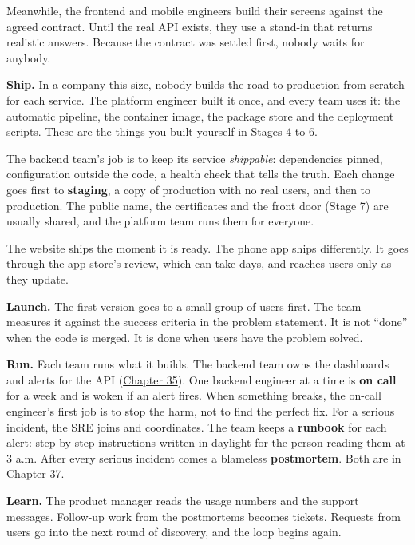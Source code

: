 Meanwhile, the frontend and mobile engineers build their screens against the agreed contract. Until the real API exists, they use a stand-in that returns realistic answers. Because the contract was settled first, nobody waits for anybody.

\textbf{Ship.} In a company this size, nobody builds the road to production from scratch for each service. The platform engineer built it once, and every team uses it: the automatic pipeline, the container image, the package store and the deployment scripts. These are the things you built yourself in Stages 4 to 6.

The backend team's job is to keep its service \emph{shippable}: dependencies pinned, configuration outside the code, a health check that tells the truth. Each change goes first to \textbf{staging}, a copy of production with no real users, and then to production. The public name, the certificates and the front door (Stage 7) are usually shared, and the platform team runs them for everyone.

The website ships the moment it is ready. The phone app ships differently. It goes through the app store's review, which can take days, and reaches users only as they update.

\textbf{Launch.} The first version goes to a small group of users first. The team measures it against the success criteria in the problem statement. It is not ``done'' when the code is merged. It is done when users have the problem solved.

\textbf{Run.} Each team runs what it builds. The backend team owns the dashboards and alerts for the API (\hyperref[ch:35-observability]{Chapter 35}). One backend engineer at a time is \textbf{on call} for a week and is woken if an alert fires. When something breaks, the on-call engineer's first job is to stop the harm, not to find the perfect fix. For a serious incident, the SRE joins and coordinates. The team keeps a \textbf{runbook} for each alert: step-by-step instructions written in daylight for the person reading them at 3 a.m. After every serious incident comes a blameless \textbf{postmortem}. Both are in \hyperref[ch:37-reliability]{Chapter 37}.

\textbf{Learn.} The product manager reads the usage numbers and the support messages. Follow-up work from the postmortems becomes tickets. Requests from users go into the next round of discovery, and the loop begins again.

\label{the-same-process-in-a-team:where-hand-offs-break}

